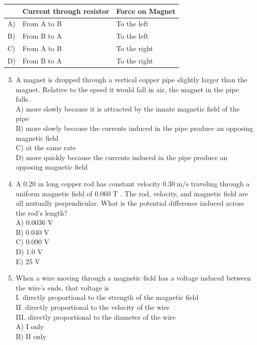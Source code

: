 \begin{enumerate}
\begin{center}
\begin{tabular}{|l|l|l|}
\hline
 & Current through resistor & Force on Magnet \\
\hline
A) & From A to B & To the left \\
\hline
B) & From B to A & To the left \\
\hline
C) & From A to B & To the right \\
\hline
D) & From B to A & To the right \\
\hline
\end{tabular}
\end{center}

\begin{enumerate}
  \setcounter{enumi}{2}
  \item A magnet is dropped through a vertical copper pipe slightly larger than the magnet. Relative to the speed it would fall in air, the magnet in the pipe falls.\\
A) more slowly because it is attracted by the innate magnetic field of the pipe\\
B) more slowly because the currents induced in the pipe produce an opposing magnetic field\\
C) at the same rate\\
D) more quickly because the currents induced in the pipe produce an opposing magnetic field
  \item A 0.20 m long copper rod has constant velocity $0.30 \mathrm{~m} / \mathrm{s}$ traveling through a uniform magnetic field of 0.060 T . The rod, velocity, and magnetic field are all mutually perpendicular. What is the potential difference induced across the rod's length?\\
A) 0.0036 V\\
B) 0.040 V\\
C) 0.090 V\\
D) 1.0 V\\
E) 25 V
  \item When a wire moving through a magnetic field has a voltage induced between the wire's ends, that voltage is\\
I. directly proportional to the strength of the magnetic field\\
II. directly proportional to the velocity of the wire\\
III. directly proportional to the diameter of the wire\\
A) I only\\
B) II only\\

\end{enumerate}
\end{enumerate}
